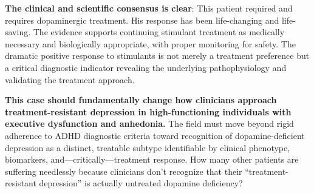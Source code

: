 \textbf{The clinical and scientific consensus is clear}: This patient required and requires dopaminergic treatment. His response has been life-changing and life-saving. The evidence supports continuing stimulant treatment as medically necessary and biologically appropriate, with proper monitoring for safety. The dramatic positive response to stimulants is not merely a treatment preference but a critical diagnostic indicator revealing the underlying pathophysiology and validating the treatment approach.

\textbf{This case should fundamentally change how clinicians approach treatment-resistant depression in high-functioning individuals with executive dysfunction and anhedonia.} The field must move beyond rigid adherence to ADHD diagnostic criteria toward recognition of dopamine-deficient depression as a distinct, treatable subtype identifiable by clinical phenotype, biomarkers, and---critically---treatment response. How many other patients are suffering needlessly because clinicians don't recognize that their ``treatment-resistant depression'' is actually untreated dopamine deficiency?
